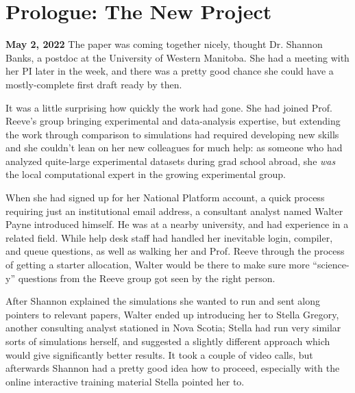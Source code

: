 \documentclass[11pt, letterpaper, twoside]{article}
\begin{document}
\section*{Prologue: The New Project}
%

\begin{tcolorbox}[enhanced,breakable,colback=gray!15,colframe=cdaRed,parbox=false]
\sffamily \textbf{May 2, 2022} The paper was coming together nicely,
thought Dr. Shannon Banks, a postdoc at the University of Western
Manitoba. She had a meeting with her PI later in the week, and there
was a pretty good chance she could have a mostly-complete first draft
ready by then.

It was a little surprising how quickly the work had gone. She had joined
Prof. Reeve's group bringing experimental and data-analysis expertise,
but extending the work through comparison to simulations had required
developing new skills and she couldn't lean on her new colleagues for
much help: as someone who had analyzed quite-large experimental datasets
during grad school abroad, she \textit{was} the local computational
expert in the growing experimental group.

When she had signed up for her National Platform account, a quick
process requiring just an institutional email address, a consultant
analyst named Walter Payne introduced himself. He was at a nearby
university, and had experience in a related field. While help desk staff
had handled her inevitable login, compiler, and queue questions, as well
as walking her and Prof. Reeve through the process of getting a starter
allocation, Walter would be there to make sure more ``science-y''
questions from the Reeve group got seen by the right person.

After Shannon explained the simulations she wanted to run and sent along
pointers to relevant papers, Walter ended up introducing her to Stella
Gregory, another consulting analyst stationed in Nova Scotia; Stella had
run very similar sorts of simulations herself, and suggested a slightly
different approach which would give significantly better results. It
took a couple of video calls, but afterwards Shannon had a pretty good
idea how to proceed, especially with the online interactive training
material Stella pointed her to.


\end{tcolorbox}
\end{document}
